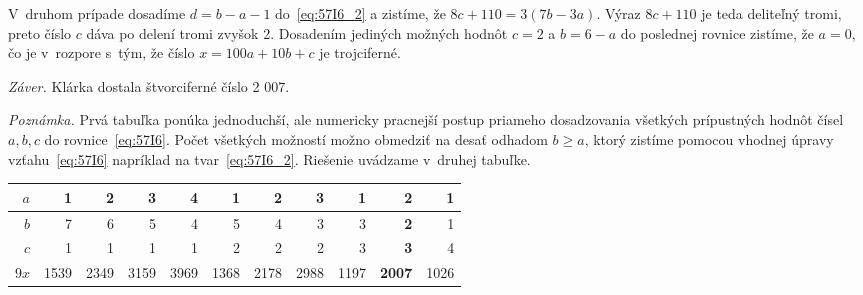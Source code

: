 {V~druhom prípade dosadíme $d = b - a - 1$ do~\ref{eq:57I6_2} a zistíme, že $8c + 110 = 3(7b-3a)$. Výraz $8c+110$ je teda deliteľný tromi, preto číslo $c$ dáva po delení tromi zvyšok 2. Dosadením jediných možných hodnôt $c = 2$ a $b = 6 - a$ do poslednej rovnice zistíme, že $a = 0$, čo je v~rozpore s~tým, že číslo $x = 100a + 10b + c$ je trojciferné.

\textit{Záver.} Klárka dostala štvorciferné číslo 2 007.

\textit{Poznámka.} Prvá tabuľka ponúka jednoduchší, ale numericky pracnejší postup priameho dosadzovania všetkých prípustných hodnôt čísel $a, b, c$ do rovnice~\ref{eq:57I6}. Počet všetkých možností možno obmedziť na desať odhadom $b \geq a$, ktorý zistíme pomocou vhodnej úpravy vzťahu~\ref{eq:57I6} napríklad na tvar~\ref{eq:57I6_2}. Riešenie uvádzame v~druhej tabuľke.
\begin{center}
\begin{tabular}{|r||r|r|r|r|r|r|r|r|r|r|}
\hline
$a$ & 1 & 2 & 3 & 4 & 1 & 2 & 3 & 1 & \textbf{2} & 1\\
\hline
$b$ & 7 & 6 & 5 & 4 & 5 & 4 & 3 & 3 & \textbf{2} & 1 \\
\hline
$c$ & 1 & 1 & 1 & 1 & 2 & 2 & 2 & 3 & \textbf{3} & 4 \\
\hline
$9x$ & 1539 & 2349 & 3159 & 3969 & 1368 & 2178 & 2988 & 1197 & \textbf{2007} & 1026\\
\hline
\end{tabular}
\end{center}
}
